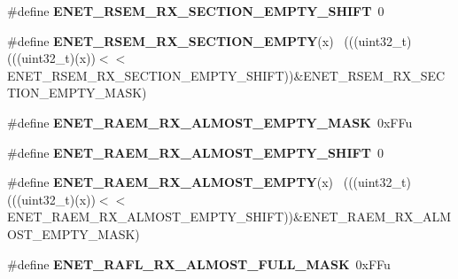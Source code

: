 \begin{DoxyCompactItemize}
\item 
\hypertarget{group___e_n_e_t___register___masks_gabd36b25a63e3ac019e1d718bb419f6b0}{}\#define {\bfseries E\+N\+E\+T\+\_\+\+R\+S\+E\+M\+\_\+\+R\+X\+\_\+\+S\+E\+C\+T\+I\+O\+N\+\_\+\+E\+M\+P\+T\+Y\+\_\+\+S\+H\+I\+F\+T}~0\label{group___e_n_e_t___register___masks_gabd36b25a63e3ac019e1d718bb419f6b0}

\item 
\hypertarget{group___e_n_e_t___register___masks_ga9530c0fe2522abb3d0d082f1d88fccb2}{}\#define {\bfseries E\+N\+E\+T\+\_\+\+R\+S\+E\+M\+\_\+\+R\+X\+\_\+\+S\+E\+C\+T\+I\+O\+N\+\_\+\+E\+M\+P\+T\+Y}(x)                    ~(((uint32\+\_\+t)(((uint32\+\_\+t)(x))$<$$<$E\+N\+E\+T\+\_\+\+R\+S\+E\+M\+\_\+\+R\+X\+\_\+\+S\+E\+C\+T\+I\+O\+N\+\_\+\+E\+M\+P\+T\+Y\+\_\+\+S\+H\+I\+F\+T))\&E\+N\+E\+T\+\_\+\+R\+S\+E\+M\+\_\+\+R\+X\+\_\+\+S\+E\+C\+T\+I\+O\+N\+\_\+\+E\+M\+P\+T\+Y\+\_\+\+M\+A\+S\+K)\label{group___e_n_e_t___register___masks_ga9530c0fe2522abb3d0d082f1d88fccb2}

\item 
\hypertarget{group___e_n_e_t___register___masks_ga37982efb14bcd40ca10c696e7368dce2}{}\#define {\bfseries E\+N\+E\+T\+\_\+\+R\+A\+E\+M\+\_\+\+R\+X\+\_\+\+A\+L\+M\+O\+S\+T\+\_\+\+E\+M\+P\+T\+Y\+\_\+\+M\+A\+S\+K}~0x\+F\+Fu\label{group___e_n_e_t___register___masks_ga37982efb14bcd40ca10c696e7368dce2}

\item 
\hypertarget{group___e_n_e_t___register___masks_gad89e89d3db86bdebd82cba2f2994e4df}{}\#define {\bfseries E\+N\+E\+T\+\_\+\+R\+A\+E\+M\+\_\+\+R\+X\+\_\+\+A\+L\+M\+O\+S\+T\+\_\+\+E\+M\+P\+T\+Y\+\_\+\+S\+H\+I\+F\+T}~0\label{group___e_n_e_t___register___masks_gad89e89d3db86bdebd82cba2f2994e4df}

\item 
\hypertarget{group___e_n_e_t___register___masks_ga3b66191ef153e05fcfeac75a59f0e3b1}{}\#define {\bfseries E\+N\+E\+T\+\_\+\+R\+A\+E\+M\+\_\+\+R\+X\+\_\+\+A\+L\+M\+O\+S\+T\+\_\+\+E\+M\+P\+T\+Y}(x)                      ~(((uint32\+\_\+t)(((uint32\+\_\+t)(x))$<$$<$E\+N\+E\+T\+\_\+\+R\+A\+E\+M\+\_\+\+R\+X\+\_\+\+A\+L\+M\+O\+S\+T\+\_\+\+E\+M\+P\+T\+Y\+\_\+\+S\+H\+I\+F\+T))\&E\+N\+E\+T\+\_\+\+R\+A\+E\+M\+\_\+\+R\+X\+\_\+\+A\+L\+M\+O\+S\+T\+\_\+\+E\+M\+P\+T\+Y\+\_\+\+M\+A\+S\+K)\label{group___e_n_e_t___register___masks_ga3b66191ef153e05fcfeac75a59f0e3b1}

\item 
\hypertarget{group___e_n_e_t___register___masks_ga3b79bb95900a65117a1e64a98e0ca741}{}\#define {\bfseries E\+N\+E\+T\+\_\+\+R\+A\+F\+L\+\_\+\+R\+X\+\_\+\+A\+L\+M\+O\+S\+T\+\_\+\+F\+U\+L\+L\+\_\+\+M\+A\+S\+K}~0x\+F\+Fu\label{group___e_n_e_t___register___masks_ga3b79bb95900a65117a1e64a98e0ca741}


\end{DoxyCompactItemize}
